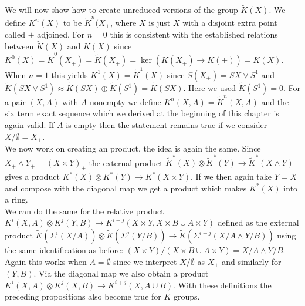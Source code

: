 \documentclass[../Thesis.tex]{subfiles}
\begin{document}
We will now show how to create unreduced versions of the group $\tilde{K}(X)$. We define $K^n(X)$ to be $\tilde{K}^n(X_+$, where $X$ is just $X$ with a disjoint extra point called $+$ adjoined. For $n = 0$ this is consistent with the established relations between $\tilde{K}(X)$ and $K(X)$ since $K^0(X) = \tilde{K}^0(X_+) = \tilde{K}(X_+) = \ker( K(X_+) \rightarrow K(+)) = K(X)$. When $n = 1$ this yields $K^1(X) = \tilde{K}^1(X)$ since $S(X_+) = SX \vee S^1$ and $\tilde{K}(SX \vee S^1) \approx \tilde{K}(SX) \oplus \tilde{K}(S^1) = \tilde{K}(SX)$. Here we used $\tilde{K}(S^1) = 0$. For a pair $(X,A)$ with $A$ nonempty we define $K^n(X,A) = \tilde{K}^n(X,A)$ and the six term exact sequence which we derived at the beginning of this chapter is again valid. If $A$ is empty then the statement remains true if we consider $X/\emptyset = X_+$.
\\We now work on creating an product, the idea is again the same. Since $X_+ \wedge Y_+ = (X \times Y)_+$ the external product $\tilde{K}^*(X) \otimes \tilde{K}^ *(Y) \rightarrow \tilde{K}^* ( X \wedge Y)$ gives a product $K^*(X) \otimes K^*(Y) \rightarrow K^*(X \times Y)$. If we then again take $ Y = X$ and compose with the diagonal map we get a product which makes $K^*(X)$ into a ring.
\\We can do the same for the relative product $K^i(X,A) \otimes K^j(Y,B) \rightarrow K^{i + j} ( X \times Y, X \times B \cup A \times Y)$ defined as the external product $\tilde{K}(\Sigma^i(X/A)) \otimes \tilde{K}(\Sigma^j(Y/B)) \rightarrow \tilde{K}( \Sigma^{i + j}(X/A \wedge Y/B))$ using the same identification as before: $(X \times Y)/(X \times B \cup A \times Y) = X/A \wedge Y/B$. Again this works when $A = \emptyset$ since we interpret $X/\emptyset$ as $X_+$ and similarly for $(Y,B)$. Via the diagonal map we also obtain a product $K^i(X,A) \otimes K^j(X,B) \rightarrow K^{i + j} (X, A \cup B)$. With these definitions the preceding propositions also become true for $K$ groups.
\end{document}
